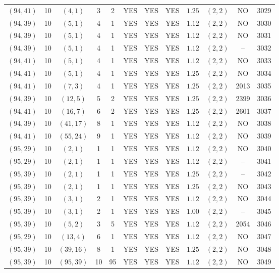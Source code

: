 \begin{longtable}{|c|c|c|c|c|c|c|c|c|c|c|c|}
$(94,41)$ & 10 & $(4,1)$ & 3 & 2 & YES & YES & YES & $1.25$ & $(2,2)$ & NO & 3029\\
$(94,39)$ & 10 & $(5,1)$ & 4 & 1 & YES & YES & YES & $1.12$ & $(2,2)$ & NO & 3030\\
$(94,39)$ & 10 & $(5,1)$ & 4 & 1 & YES & YES & YES & $1.12$ & $(2,2)$ & NO & 3031\\
$(94,39)$ & 10 & $(5,1)$ & 4 & 1 & YES & YES & YES & $1.12$ & $(2,2)$ & -- & 3032\\
$(94,41)$ & 10 & $(5,1)$ & 4 & 1 & YES & YES & YES & $1.12$ & $(2,2)$ & NO & 3033\\
$(94,41)$ & 10 & $(5,1)$ & 4 & 1 & YES & YES & YES & $1.25$ & $(2,2)$ & NO & 3034\\
$(94,41)$ & 10 & $(7,3)$ & 4 & 1 & YES & YES & YES & $1.25$ & $(2,2)$ & 2013 & 3035\\
$(94,39)$ & 10 & $(12,5)$ & 5 & 2 & YES & YES & YES & $1.25$ & $(2,2)$ & 2399 & 3036\\
$(94,41)$ & 10 & $(16,7)$ & 6 & 2 & YES & YES & YES & $1.25$ & $(2,2)$ & 2601 & 3037\\
$(94,39)$ & 10 & $(41,17)$ & 8 & 1 & YES & YES & YES & $1.12$ & $(2,2)$ & NO & 3038\\
$(94,41)$ & 10 & $(55,24)$ & 9 & 1 & YES & YES & YES & $1.12$ & $(2,2)$ & NO & 3039\\
$(95,29)$ & 10 & $(2,1)$ & 1 & 1 & YES & YES & YES & $1.12$ & $(2,2)$ & NO & 3040\\
$(95,29)$ & 10 & $(2,1)$ & 1 & 1 & YES & YES & YES & $1.12$ & $(2,2)$ & -- & 3041\\
$(95,39)$ & 10 & $(2,1)$ & 1 & 1 & YES & YES & YES & $1.25$ & $(2,2)$ & -- & 3042\\
$(95,39)$ & 10 & $(2,1)$ & 1 & 1 & YES & YES & YES & $1.25$ & $(2,2)$ & NO & 3043\\
$(95,39)$ & 10 & $(3,1)$ & 2 & 1 & YES & YES & YES & $1.12$ & $(2,2)$ & NO & 3044\\
$(95,39)$ & 10 & $(3,1)$ & 2 & 1 & YES & YES & YES & $1.00$ & $(2,2)$ & -- & 3045\\
$(95,39)$ & 10 & $(5,2)$ & 3 & 5 & YES & YES & YES & $1.12$ & $(2,2)$ & 2054 & 3046\\
$(95,29)$ & 10 & $(13,4)$ & 6 & 1 & YES & YES & YES & $1.12$ & $(2,2)$ & NO & 3047\\
$(95,39)$ & 10 & $(39,16)$ & 8 & 1 & YES & YES & YES & $1.25$ & $(2,2)$ & NO & 3048\\
$(95,39)$ & 10 & $(95,39)$ & 10 & 95 & YES & YES & YES & $1.12$ & $(2,2)$ & NO & 3049\\

\end{longtable}
